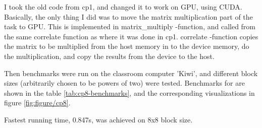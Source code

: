 I took the old code from cp1, and changed it to work on GPU, using CUDA. Basically, the only thing I did was to move the matrix multiplication part of the task to GPU. This is implemented in matrix\_multiply -function, and called from the same correlate function as where it was done in cp1. correlate -function copies the matrix to be multiplied from the host memory in to the device memory, do the multiplication, and copy the results from the device to the host.

Then benchmarks were run on the classroom computer 'Kiwi', and different block sizes (arbitrarily chosen to be powers of two) were tested. Benchmarks for are shown in the table \ref{tab:cp8-benchmarks}, and the corresponding visualizations in figure \ref{fig:figure/cp8}.

Fastest running time, 0.847s, was achieved on 8x8 block size.

